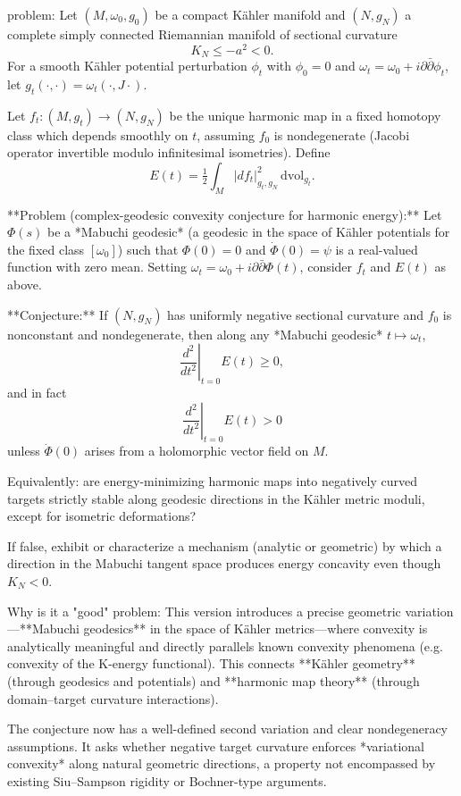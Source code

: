 problem:  
Let \( (M, \omega_0, g_0) \) be a compact Kähler manifold and \( (N,g_N) \) a complete simply connected Riemannian manifold of sectional curvature  
\[
K_N \le -a^2 < 0.
\]
For a smooth Kähler potential perturbation \( \phi_t \) with \( \phi_0 = 0 \) and \( \omega_t = \omega_0 + i\partial\bar{\partial}\phi_t \), let \( g_t(\cdot,\cdot) = \omega_t(\cdot,J\cdot) \).  

Let \(f_t : (M,g_t)\to (N,g_N)\) be the unique harmonic map in a fixed homotopy class which depends smoothly on \(t\), assuming \(f_0\) is nondegenerate (Jacobi operator invertible modulo infinitesimal isometries).  
Define 
\[
E(t) = \tfrac{1}{2}\int_M |df_t|^2_{g_t,g_N}\,\mathrm{dvol}_{g_t}.
\]

**Problem (complex-geodesic convexity conjecture for harmonic energy):**  
Let \(\Phi(s)\) be a *Mabuchi geodesic* (a geodesic in the space of Kähler potentials for the fixed class \([\omega_0]\)) such that \(\Phi(0)=0\) and \(\dot\Phi(0)=\psi\) is a real-valued function with zero mean. Setting \( \omega_t = \omega_0 + i\partial\bar{\partial}\Phi(t)\), consider \( f_t \) and \(E(t)\) as above.  

**Conjecture:**  
If \( (N,g_N) \) has uniformly negative sectional curvature and \(f_0\) is nonconstant and nondegenerate, then along any *Mabuchi geodesic* \(t\mapsto \omega_t\),
\[
\left.\frac{d^2}{dt^2}\right|_{t=0} E(t) \ge 0,
\]
and in fact
\[
\left.\frac{d^2}{dt^2}\right|_{t=0} E(t) > 0
\]
unless \( \dot\Phi(0) \) arises from a holomorphic vector field on \(M\).  

Equivalently: are energy-minimizing harmonic maps into negatively curved targets strictly stable along geodesic directions in the Kähler metric moduli, except for isometric deformations?  

If false, exhibit or characterize a mechanism (analytic or geometric) by which a direction in the Mabuchi tangent space produces energy concavity even though \(K_N<0\).

Why is it a "good" problem:  
This version introduces a precise geometric variation—**Mabuchi geodesics** in the space of Kähler metrics—where convexity is analytically meaningful and directly parallels known convexity phenomena (e.g. convexity of the K-energy functional). This connects **Kähler geometry** (through geodesics and potentials) and **harmonic map theory** (through domain–target curvature interactions).  

The conjecture now has a well-defined second variation and clear nondegeneracy assumptions. It asks whether negative target curvature enforces *variational convexity* along natural geometric directions, a property not encompassed by existing Siu–Sampson rigidity or Bochner-type arguments.  

